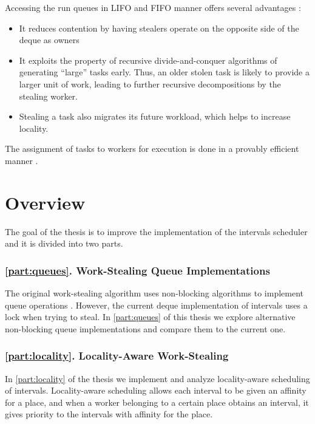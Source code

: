 
Accessing the run queues in LIFO and FIFO manner offers several
advantages \cite{Frigo1998}:

\begin{itemize}
\item It reduces contention by having stealers operate on the opposite
  side of the deque as owners
\item It exploits the property of recursive divide-and-conquer
  algorithms of generating ``large'' tasks early. Thus, an older
  stolen task is likely to provide a larger unit of work, leading to
  further recursive decompositions by the stealing worker.
\item Stealing a task also migrates its future workload, which helps
  to increase locality.
\end{itemize}

The assignment of tasks to workers for execution is done in a provably
efficient manner \cite{Blumofe1995, Blumofe1999}.


\section{Overview}
\label{sec:intro-overview}

The goal of the thesis is to improve the implementation of the
intervals scheduler and it is divided into two parts.

\subsubsection{\autoref{part:queues}. Work-Stealing Queue
  Implementations}

The original work-stealing algorithm uses non-blocking algorithms to
implement queue operations \cite{Arora2001}. However, the current
deque implementation of intervals uses a lock when trying to steal. In
\autoref{part:queues} of this thesis we explore alternative
non-blocking queue implementations and compare them to the current
one.

\subsubsection{\autoref{part:locality}. Locality-Aware Work-Stealing}

In \autoref{part:locality} of the thesis we implement and analyze
locality-aware scheduling of intervals. Locality-aware scheduling
allows each interval to be given an affinity for a place, and when a
worker belonging to a certain place obtains an interval, it gives
priority to the intervals with affinity for the place.

